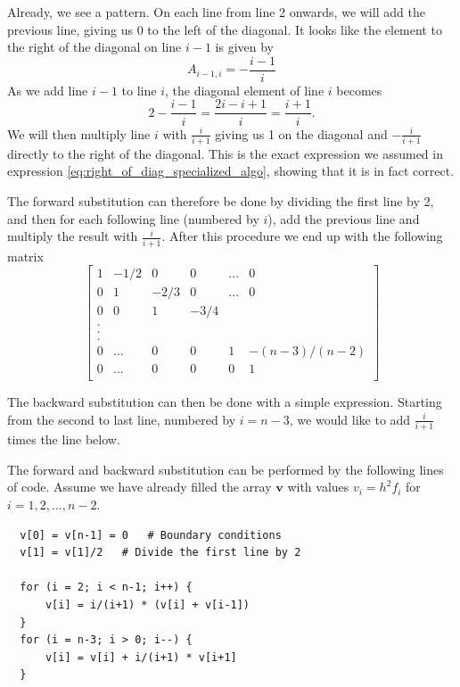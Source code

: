 \documentclass[reprint, english,notitlepage]{revtex4-1}  %
\begin{document}
Already, we see a pattern. On each line from line 2 onwards, we will add the previous line, giving us 0 to the left of the diagonal. It looks like the element to the right of the diagonal on line $i-1$ is given by
\begin{equation}
  \label{eq:right_of_diag_specialized_algo}
  A_{i-1, i} = -\frac{i-1}{i}
\end{equation}
As we add line $i-1$ to line $i$, the diagonal element of line $i$ becomes
\begin{equation}
  \label{eq:diagonal_element_specialized_algo}
  2 - \frac{i-1}{i} = \frac{2i - i + 1}{i} = \frac{i+1}{i}.
\end{equation}
We will then multiply line $i$ with $\frac{i}{i+1}$ giving us 1 on the diagonal and $-\frac{i}{i+1}$ directly to the right of the diagonal. This is the exact expression we assumed in expression \ref{eq:right_of_diag_specialized_algo}, showing that it is in fact correct.

The forward substitution can therefore be done by dividing the first line by 2, and then for each following line (numbered by $i$), add the previous line and multiply the result with $\frac{i}{i+1}$. After this procedure we end up with the following matrix
\begin{equation*}{}
  \begin{bmatrix}
1  & -1/2 & 0  & 0  & ... & 0 \\
0  & 1  & -2/3 & 0  & ... & 0 \\
0  & 0  &  1 & -3/4 &     & \\
.  &    &    &   &     & \\
.  &    &    &   &     & \\
.  &    &    &   &     & \\
0  & ...& 0  & 0 & 1 & -(n - 3)/(n - 2)  \\
0  & ...& 0  & 0 & 0 & 1  \\
\end{bmatrix}
\end{equation*}

The backward substitution can then be done with a simple expression. Starting from the second to last line, numbered by $i = n-3$, we would like to add $\frac{i}{i+1}$ times the line below.

The forward and backward substitution can be performed by the following lines of code. Assume we have already filled the array $\boldsymbol{v}$ with values $v_i = h^2 f_i$ for $i = 1, 2, ..., n-2$.
\begin{verbatim}
  v[0] = v[n-1] = 0   # Boundary conditions
  v[1] = v[1]/2   # Divide the first line by 2

  for (i = 2; i < n-1; i++) {
      v[i] = i/(i+1) * (v[i] + v[i-1])
  }
  for (i = n-3; i > 0; i--) {
      v[i] = v[i] + i/(i+1) * v[i+1]
  }
\end{verbatim}
\end{document}
